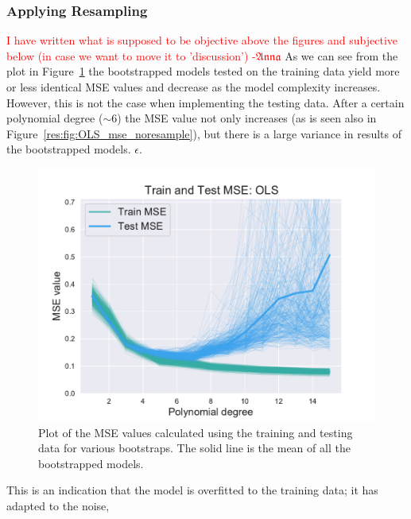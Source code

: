 \documentclass[twocolumn,english,notitlepage]{article}
\newcommand{\comment}[1]{\textcolor{red}{#1}}
\newcommand{\Anna}{$\mathfrak{Anna}$}
\begin{document}
        \subsubsection{Applying Resampling}
        \comment{I  have written what is supposed to be objective above the figures and subjective below (in case we want to move it to 'discussion') -\Anna}
            As we can see from the plot in Figure~\ref{res:fig:bs_train_test_ols} the bootstrapped models tested on the training data yield more or less identical MSE values and decrease as the model complexity increases. However, this is not the case when implementing the testing data. After a certain polynomial degree ($\sim 6$) the MSE value not only increases (as is seen also in Figure~\ref{res:fig:OLS_mse_noresample}), but there is a large variance in results of the bootstrapped models. $\epsilon$.  
            \begin{figure}[ht]
                \centering
                \includegraphics[width=\linewidth]{BS_train_test_mse_OLS.pdf}
                \caption{Plot of the MSE values calculated using the training and testing data for various bootstraps. The solid line is the mean of all the bootstrapped models.}
                \label{res:fig:bs_train_test_ols}
            \end{figure}
            This is an indication that the model is overfitted to the training data; it has adapted to the noise, 
  
\end{document}
